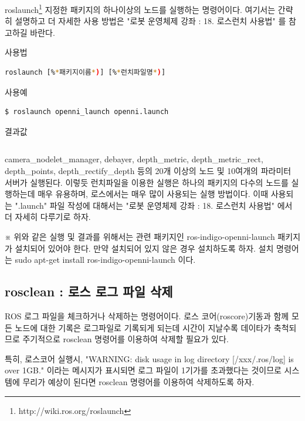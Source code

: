 roslaunch\footnote{http://wiki.ros.org/roslaunch} 지정한 패키지의 하나이상의 노드를 실행하는 명령어이다. 여기서는 간략히 설명하고 더 자세한 사용 방법은 "로봇 운영체제 강좌 : 18. 로스런치 사용법" 를 참고하길 바란다. 

\setcounter{num}{0}

\vspace{\baselineskip}
\noindent
{}\circled{\thenum} 사용법
\begin{lstlisting}[language=bash]
roslaunch [%*패키지이름*)] [%*런치파일명*)]
\end{lstlisting}

\noindent
{}\circled{\thenum} 사용예
\begin{lstlisting}[language=bash]
$ roslaunch openni_launch openni.launch 
\end{lstlisting}

\noindent
{}\circled{\thenum} 결과값
\begin{lstlisting}[language=bash]
%*생략*)
\end{lstlisting}

camera\_nodelet\_manager,  debayer,  depth\_metric,   depth\_metric\_rect, depth\_points, depth\_rectify\_depth 등의 20개 이상의 노드 및  10여개의 파라미터 서버가 실행된다. 이렇듯 런치파일을 이용한 실행은 하나의 패키지의 다수의 노드를 실행하는데 매우 유용하며, 로스에서는 매우 많이 사용되는 실행 방법이다. 이때 사용되는 ".launch" 파일 작성에 대해서는 "로봇 운영체제 강좌 : 18. 로스런치 사용법" 에서 더 자세히 다루기로 하자.

※ 위와 같은 실행 및 결과를 위해서는 관련 패키지인 ros-indigo-openni-launch 패키지가 설치되어 있어야 한다. 만약 설치되어 있지 않은 경우 설치하도록 하자. 설치 명령어는 sudo apt-get install ros-indigo-openni-launch  이다.

\subsection{rosclean : 로스 로그 파일 삭제}

ROS 로그 파일을 체크하거나 삭제하는 명령어이다. 로스 코어(roscore)기동과 함께 모든 노드에 대한 기록은 로그파일로 기록되게 되는데 시간이 지날수록 데이타가 축척되므로 주기적으로 rosclean 명령어를 이용하여 삭제할 필요가 있다.

특히, 로스코어 실행시, "WARNING: disk usage in log directory [/xxx/.ros/log] is over 1GB." 이라는 메시지가 표시되면 로그 파일이 1기가를 초과했다는 것이므로 시스템에 무리가 예상이 된다면 rosclean 명령어를 이용하여 삭제하도록 하자.

